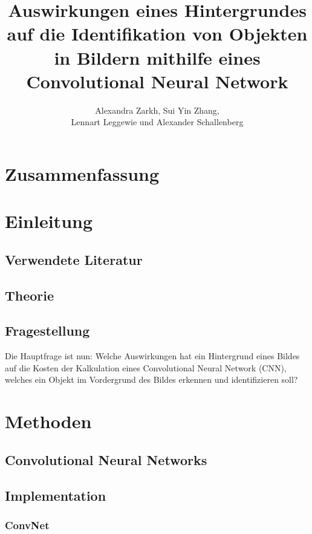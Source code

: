 \documentclass[paper=A4,pagesize=auto,12pt,headinclude=true,footinclude=true,BCOR=0mm,DIV=calc]{scrartcl}
\title{Auswirkungen eines Hintergrundes auf die Identifikation von Objekten in Bildern mithilfe eines Convolutional Neural Network}
\author{Alexandra Zarkh, Sui Yin Zhang,\\ Lennart Leggewie und Alexander Schallenberg}
\begin{document}
\begin{titlepage}
	\maketitle
\end{titlepage}

\tableofcontents
\newpage


\section{Zusammenfassung}


\section{Einleitung}

\subsection{Verwendete Literatur}

\subsection{Theorie} %

\subsection{Fragestellung}
Die Hauptfrage ist nun: Welche Auswirkungen hat ein Hintergrund eines Bildes auf die Kosten der Kalkulation eines Convolutional Neural Network (CNN), welches ein Objekt im Vordergrund des Bildes erkennen und identifizieren soll?


\section{Methoden}

\subsection{Convolutional Neural Networks} %

\subsection{Implementation}

\subsubsection{ConvNet} %
\end{document}
